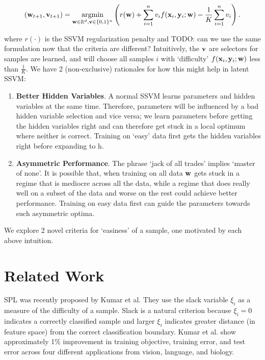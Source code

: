 \documentclass{article}
\newcommand{\mysection}[1]{\vspace{-4mm}\section{#1}\vspace{-4mm}}
\newcommand{\argmin}{\operatornamewithlimits{argmin}}
\begin{document}
\begin{equation}
({\bf w}_{t+1}, {\bf v}_{t+1}) = \argmin_{{\bf w} \in \mathbb{R}^d,{\bf v} \in \{0,1\}^n}
\left(r({\bf w}) + \sum_{i=1}^n v_i f({\bf x}_i,{\bf y}_i; {\bf w}) -
\frac{1}{K}\sum_{i=1}^n v_i\right).
\label{eq:selfPacedMIP}
\end{equation}


where $r(\cdot)$ is the SSVM regularization penalty and TODO: can we use the same formulation now that the criteria are different?  
Intuitively, the $\bf v$ are selectors for samples are learned, and will choose all samples $i$ with `difficulty' $f({\bf x}_i,{\bf y}_i; {\bf w})$ less than $\frac{1}{K}$. We have 2 (non-exclusive) rationales for how this might help in latent SSVM:

\begin{enumerate}
\item \textbf{Better Hidden Variables}.  A normal SSVM learns parameters and hidden variables at the same time.  Therefore, parameters will be influenced by a bad hidden variable selection and vice versa; we learn parameters before getting the hidden variables right and can therefore get stuck in a local optimum where neither is correct.  Training on `easy' data first gets the hidden variables right before expanding to h.
\item \textbf{Asymmetric Performance}.  The phrase `jack of all trades' implies `master of none'.  It is possible that, when training on all data $\bf w$ gets stuck in a regime that is mediocre across all the data, while a regime that does really well on a subset of the data and worse on the rest could achieve better performance.  Training on easy data first can guide the parameters towards such asymmetric optima.
\end{enumerate}

We explore 2 novel criteria for `easiness' of a sample, one motivated by each above intuition.

\mysection{Related Work}
\label{sec:related}
SPL was recently proposed by Kumar et al.  They use the slack variable $\xi_i$ as a measure of the difficulty of a sample.  Slack is a natural criterion because $\xi_i=0$ indicates a correctly classified sample and larger $\xi_i$ indicates greater distance (in feature space) from the correct classification boundary.  Kumar et al. show approximately 1\% improvement in training objective, training error, and test error across four different applications from vision, language, and biology\cite{SPL}.
\end{document}
